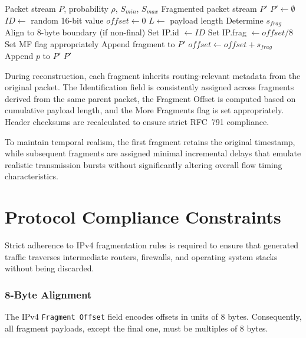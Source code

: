 \begin{algorithm}[h]
\caption{Stochastic RFC-Compliant IP Fragmentation}
\label{alg:stochastic_fragmentation}
\begin{algorithmic}[1]
\Require Packet stream $P$, probability $\rho$, $S_{min}$, $S_{max}$
\Ensure Fragmented packet stream $P'$
\State $P' \gets \emptyset$
        \State $ID \gets$ random 16-bit value
        \State $offset \gets 0$
        \State $L \gets$ payload length
            \State Determine $s_{frag}$
            \State Align to 8-byte boundary (if non-final)
            \State Set IP.id $\gets ID$
            \State Set IP.frag $\gets offset/8$
            \State Set MF flag appropriately
            \State Append fragment to $P'$
            \State $offset \gets offset + s_{frag}$
        \EndWhile
    \Else
        \State Append $p$ to $P'$
    \EndIf
\EndFor
\State \Return $P'$
\end{algorithmic}
\end{algorithm}


During reconstruction, each fragment inherits routing-relevant metadata from the original packet. The Identification field is consistently assigned across fragments derived from the same parent packet, the Fragment Offset is computed based on cumulative payload length, and the More Fragments flag is set appropriately. Header checksums are recalculated to ensure strict RFC~791 compliance.

To maintain temporal realism, the first fragment retains the original timestamp, while subsequent fragments are assigned minimal incremental delays that emulate realistic transmission bursts without significantly altering overall flow timing characteristics.

\section{Protocol Compliance Constraints}
Strict adherence to IPv4 fragmentation rules is required to ensure that generated traffic traverses intermediate routers, firewalls, and operating system stacks without being discarded.

\subsubsection{8-Byte Alignment}

The IPv4 \texttt{Fragment Offset} field encodes offsets in units of 8 bytes. Consequently, all fragment payloads, except the final one, must be multiples of 8 bytes.

